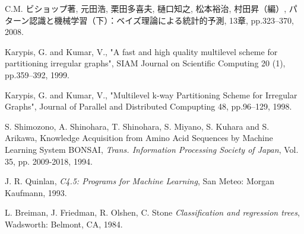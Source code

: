 
\begin{thebibliography}{9}
C.M. ビショップ著, 元田浩, 栗田多喜夫, 樋口知之, 松本裕治, 村田昇（編）, パターン認識と機械学習（下）：ベイズ理論による統計的予測, 13章, pp.323--370, 2008.

Karypis, G. and Kumar, V., "A fast and high quality multilevel scheme for partitioning irregular graphs", SIAM Journal on Scientific Computing 20 (1), pp.359--392, 1999.

Karypis, G. and Kumar, V., "Multilevel k-way Partitioning Scheme for Irregular Graphs",
Journal of Parallel and Distributed Compupting 48, pp.96--129, 1998.

S. Shimozono, A. Shinohara, T. Shinohara, S. Miyano, S. Kuhara and S. Arikawa,
Knowledge Acquisition from Amino Acid Sequences by Machine Learning System
BONSAI, {\em Trans. Information Processing Society of Japan},
Vol. 35, pp. 2009-2018, 1994.

J. R. Quinlan, {\em C4.5: Programs for Machine Learning}, San Meteo: Morgan Kaufmann, 1993.

L. Breiman, J. Friedman, R. Olshen, C. Stone
{\em  Classification and regression trees},
Wadsworth: Belmont, CA, 1984.

\end{thebibliography}


